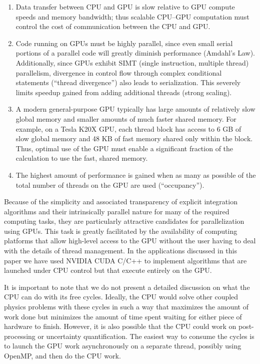 \documentclass[]{elsart}
\begin{document}
\begin{enumerate}
 \item 
Data transfer between CPU and GPU is slow relative to GPU compute speeds
and memory bandwidth; thus scalable CPU--GPU computation must control the
cost of communication between the CPU and GPU.
\item
Code running on GPUs must be highly parallel, since even small serial portions
of a parallel code will greatly diminish performance (Amdahl's Law).
Additionally, since GPUs exhibit SIMT (single instruction, multiple thread)
parallelism, divergence in control flow through complex conditional statements
(``thread divergence'') also leads to serialization.  This severely limits
speedup gained from adding additional threads (strong scaling).
\item
A modern general-purpose GPU typically has large amounts of relatively slow
global memory and smaller amounts of much faster shared memory. For example, on a
Tesla K20X GPU, each thread block has access to 6 GB of slow global memory and 48
KB of fast memory shared only within the block. Thus, optimal use of the GPU
must enable a significant fraction of the calculation to use the fast, shared
memory.
\item
The highest amount of performance is gained when as many as possible of the
total number of threads on the GPU are used (``occupancy'').
\end{enumerate}
%
Because of the simplicity and associated transparency of explicit integration 
algorithms and their intrinsically parallel nature for many of the required 
computing tasks, they are particularly attractive candidates for parallelization 
using GPUs. This task is greatly facilitated by the availability of computing 
platforms that allow high-level access to the GPU without 
the user having to deal with the details of thread management.  In the 
applications discussed in this paper we have used NVIDIA CUDA C/C++ to implement 
algorithms that are launched under CPU control but that execute entirely on the 
GPU.

It is important to note that we do not present a detailed discussion on what the
CPU can do with its free cycles. Ideally, the CPU would solve other coupled
physics problems with these cycles in such a way that maximizes the amount of
work done but minimizes the amount of time spent waiting for either piece of
hardware to finish. However, it is also possible that the CPU could work on
post-processing or uncertainty quantification. The easiest way to consume the
cycles is to launch the GPU work asynchronously on a separate thread, possibly
using OpenMP, and then do the CPU work.
\end{document}
